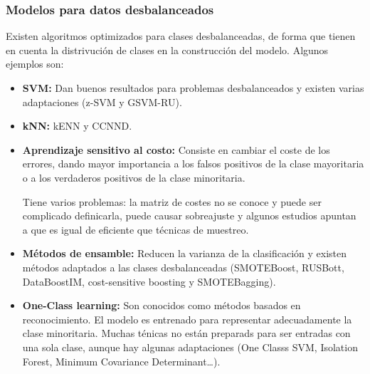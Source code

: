 \documentclass[12pt, letterpaper]{article}
\begin{document}
\subsubsection{Modelos para datos desbalanceados}
Existen algoritmos optimizados para clases desbalanceadas, de forma que tienen en cuenta la distrivución de clases en la construcción del modelo. Algunos ejemplos son:
\begin{itemize}
    \item \textbf{SVM:} Dan buenos resultados para problemas desbalanceados y existen varias adaptaciones (z-SVM y GSVM-RU).
    \item \textbf{kNN:} kENN y CCNND.\@
    \item \textbf{Aprendizaje sensitivo al costo:} Consiste en cambiar el coste de los errores, dando mayor importancia a los falsos positivos de la clase mayoritaria o a los verdaderos positivos de la clase minoritaria. 
    
    Tiene varios problemas: la matriz de costes no se conoce y puede ser complicado definicarla, puede causar sobreajuste y algunos estudios apuntan a que es igual de eficiente que técnicas de muestreo.

    \item \textbf{Métodos de ensamble:} Reducen la varianza de la clasificación y existen métodos adaptados a las clases desbalanceadas (SMOTEBoost, RUSBott, DataBoostIM, cost-sensitive boosting y SMOTEBagging).
    \item \textbf{One-Class learning:} Son conocidos como métodos basados en reconocimiento. El modelo es entrenado para representar adecuadamente la clase minoritaria. Muchas ténicas no están preparads para ser entradas con una sola clase, aunque hay algunas adaptaciones (One Classs SVM, Isolation Forest, Minimum Covariance Determinant\dots).
\end{itemize}
\end{document}
